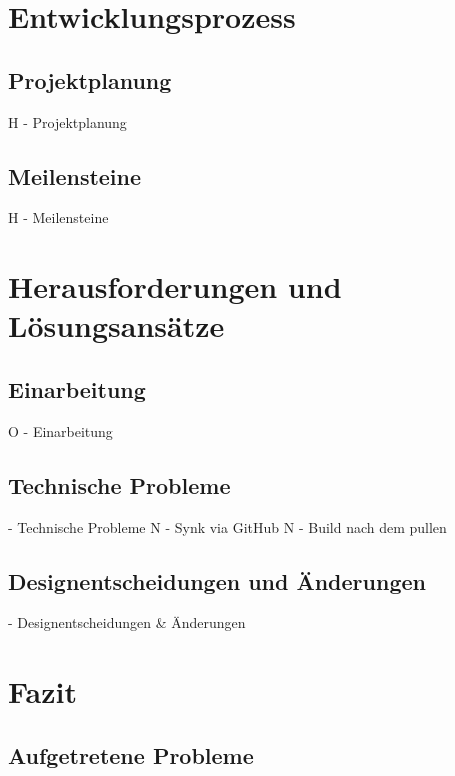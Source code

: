 \documentclass[oneside]{ausarbeitung}
\begin{document}
\chapter{Entwicklungsprozess}

\section{Projektplanung}

H - Projektplanung


\section{Meilensteine}

H - Meilensteine



\chapter{Herausforderungen und Lösungsansätze}

\section{Einarbeitung}

O - Einarbeitung


\section{Technische Probleme}

  - Technische Probleme
N   - Synk via GitHub
N   - Build nach dem pullen


\section{Designentscheidungen und Änderungen}

  - Designentscheidungen & Änderungen


\chapter{Fazit}

\section{Aufgetretene Probleme}
\end{document}
